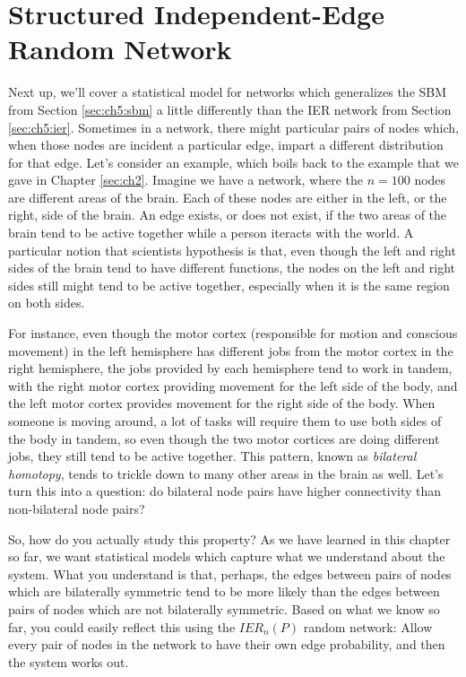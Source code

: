 \section{Structured Independent-Edge Random Network}
\label{sec:ch5:siem}

Next up, we'll cover a statistical model for networks which generalizes the SBM from Section \ref{sec:ch5:sbm} a little differently than the IER network from Section \ref{sec:ch5:ier}. Sometimes in a network, there might particular pairs of nodes which, when those nodes are incident a particular edge, impart a different distribution for that edge. Let's consider an example, which boils back to the example that we gave in Chapter \ref{sec:ch2}. Imagine we have a network, where the $n=100$ nodes are different areas of the brain.  Each of these nodes are either in the left, or the right, side of the brain. An edge exists, or does not exist, if the two areas of the brain tend to be active together while a person iteracts with the world. A particular notion that scientists hypothesis is that, even though the left and right sides of the brain tend to have different functions, the nodes on the left and right sides still might tend to be active together, especially when it is the same region on both sides. 

For instance, even though the motor cortex (responsible for {motion} and {conscious movement}) in the left hemisphere has different jobs from the motor cortex in the right hemisphere, the jobs provided by each hemisphere tend to work in tandem, with the right motor cortex providing movement for the left side of the body, and the left motor cortex provides movement for the right side of the body. When someone is moving around, a lot of tasks will require them to use both sides of the body in tandem, so even though the two motor cortices are doing different jobs, they still tend to be active together. This pattern, known as \textit{bilateral homotopy}, tends to trickle down to many other areas in the brain as well. Let's turn this into a question: do bilateral node pairs have higher connectivity than non-bilateral node pairs?

So, how do you actually study this property? As we have learned in this chapter so far, we want statistical models which capture what we understand about the system. What you understand is that, perhaps, the edges between pairs of nodes which are bilaterally symmetric tend to be more likely than the edges between pairs of nodes which are not bilaterally symmetric. Based on what we know so far, you could easily reflect this using the $IER_n(P)$ random network: Allow every pair of nodes in the network to have their own edge probability, and then the system works out.

